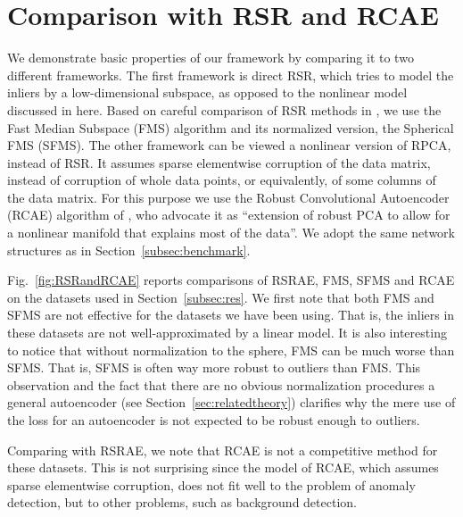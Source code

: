 \documentclass{article} \usepackage{iclr2020_conference,times}
\def\Secref#1{Section~\ref{#1}}
\begin{document}
\section{Comparison with RSR and RCAE}
\label{sec:rsrandrpca}

We demonstrate basic properties of our framework by comparing it to two different frameworks. The first framework is direct RSR, which  tries to model the inliers by a low-dimensional subspace, as opposed to the nonlinear model discussed in here. Based on careful comparison of RSR methods in \citet{lerman2018overview}, we use the Fast Median Subspace (FMS) algorithm \citep{lerman2017fast} and its normalized version, the Spherical FMS (SFMS). The other framework can be viewed a nonlinear version of RPCA, instead of RSR. It assumes sparse elementwise corruption of the data matrix, instead of corruption of whole data points, or equivalently, of some columns of the data matrix. For this purpose we use the Robust Convolutional Autoencoder (RCAE) algorithm of \citet{chalapathy2017robust}, who advocate it as ``extension of robust PCA to allow for a nonlinear manifold that explains most of the data''.  We adopt the same network structures as in \Secref{subsec:benchmark}.


Fig.~\ref{fig:RSRandRCAE} reports comparisons of RSRAE, FMS, SFMS and RCAE on the datasets used in \Secref{subsec:res}. 
We first note that both FMS and SFMS are not effective for the datasets we have been using.  That is, the inliers in these datasets are not well-approximated by a linear model. It is also interesting to notice that without normalization to the sphere, FMS can be much worse than SFMS. That is, SFMS is often way more robust to outliers than FMS. This observation and the fact that there are no obvious normalization procedures a general autoencoder (see \Secref{sec:relatedtheory}) clarifies why the mere use of the  loss for an autoencoder is not expected to be robust enough to outliers.


Comparing with RSRAE, we note that RCAE is not a competitive method for these datasets. This is not surprising since the model of RCAE, which assumes sparse elementwise corruption, does not fit well to the problem of anomaly detection, but to other problems, such as background detection. 
\end{document}
